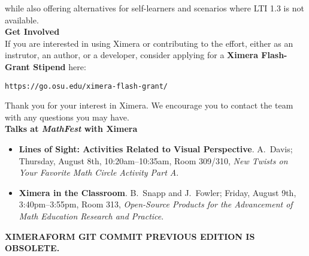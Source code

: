 \documentclass{article}
\begin{document}
\begin{multicols}{2}
\begin{center}
    \end{center}
    while also offering alternatives for self-learners and scenarios where LTI 1.3 is not
    available.
    \\[.5cm]
    {\sffamily\bfseries Get Involved}\\
    If you are interested in using Ximera or contributing to the effort, either
    as an instrutor, an author, or a developer, consider
    applying for a \textbf{Ximera Flash-Grant Stipend} here:
    \begin{center}
        \tt  https://go.osu.edu/ximera-flash-grant/
    \end{center}
    Thank you for your interest in Ximera. We encourage you
    to contact the team with  any questions you may have.
    \\[.5cm]
    {\sffamily\bfseries Talks at \textsl{MathFest} with Ximera}\\
    \begin{itemize}
        \item[{[1]}] \textbf{Lines of Sight: Activities Related to Visual
            Perspective}. A.\ Davis; Thursday, August 8th, 10:20am--10:35am,
        Room 309/310,
        \textit{New Twists on Your Favorite Math Circle Activity Part A}.
        \item[{[2]}] \textbf{Ximera in the Classroom}. B.\ Snapp and J.\
        Fowler;
        Friday, August 9th, 3:40pm--3:55pm, Room 313, \textit{Open-Source
            Products for
            the Advancement of Math Education Research and Practice}.
    \end{itemize}
\end{multicols}
\vfill
\sffamily\tiny\textbf{XIMERA\quad FORM  \quad GIT \quad COMMIT \quad
     \quad PREVIOUS \quad EDITION \quad IS
    \quad
    OBSOLETE.}
\end{document}
